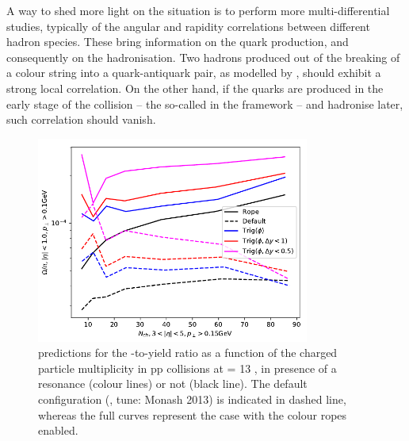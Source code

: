 A way to shed more light on the situation is to perform more multi-differential studies, typically of the angular and rapidity correlations between different hadron species. These bring information on the quark production, and consequently on the hadronisation. Two hadrons produced out of the breaking of a colour string into a quark-antiquark pair, as modelled by \Pythia, should exhibit a strong local correlation. On the other hand, if the quarks are produced in the early stage of the collision -- the so-called  in the \Epos framework \cite{wernerCorecoronaProcedureMicrocanonical2023} -- and hadronise later, such correlation should vanish.

\begin{figure}[t]
\centering
\includegraphics[width=0.8\textwidth]{Figs/Chapter6/PredictionPythia_Bierlich.png}
\caption{\Pythiaeight predictions for the \rmOmega-to-\rmPiPM yield ratio as a function of the charged particle multiplicity in pp collisions at \sqrtS =  13 \tev, in presence of a \rmPhiMes resonance (colour lines) or not (black line). The default \Pythia configuration (\Pythiaeight, tune: Monash 2013) is indicated in dashed line, whereas the full curves represent the case with the colour ropes enabled.}
	\label{fig:PredictionPythia_Bierlich}
\end{figure}

